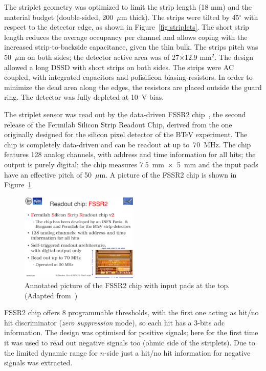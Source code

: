 The striplet geometry was optimized to limit the strip length (18 mm) and the material budget 
(double-sided, 200~$\mu$m thick). The strips were tilted by 45$^{\circ}$ with respect to the 
detector edge, as shown in Figure~\ref{fig:striplets}. The short strip length reduces the average 
occupancy per channel and allows coping with the increased strip-to-backside capacitance, given 
the thin bulk. The strips pitch was 50~$\mu$m on both sides; the detector active area was 
of 27$\times$12.9 mm$^2$. The design allowed a long DSSD with short strips on both sides.
The strips were AC coupled, with integrated capacitors and polisilicon biasing-resistors. 
In order to minimize the dead area along the edges, the resistors are placed outside the guard ring. 
The detector was fully depleted at 10~V bias.

The striplet sensor was read out by the data-driven FSSR2 chip~\cite{Re:2006zw}, 
the second release of the Fermilab Silicon Strip Readout Chip, derived from the one originally designed 
for the silicon pixel detector of the BTeV experiment. The chip is completely data-driven and can be 
readout at up to~70~MHz. The chip features 128 analog channels, with address and time information 
for all hits; the output is purely digital; the chip measures 7.5~mm~$\times$~5~mm and the input pads have an effective pitch of 50~$\mu$m. A picture of the FSSR2 chip is shown in Figure~\ref{fig:fssr2}
\begin{figure}[!htpb]
\centering
\includegraphics[width=0.5\textwidth]{fssr2.pdf}
\caption{\label{fig:fssr2}Annotated picture of the FSSR2 chip with input pads at the top. (Adapted from~\cite{Re:2006zw})}
\end{figure}


FSSR2 chip offers 8 programmable thresholds, with the first one acting as hit/no hit discriminator
({\it zero suppression} mode), 
so each hit has a 3-bits adc information. The design was optimised for positive signals; 
here for the first time it was used to read out negative signals too (ohmic side of the striplets). 
Due to the limited dynamic range for $n$-side just a hit/no hit information for negative signals was 
extracted.

